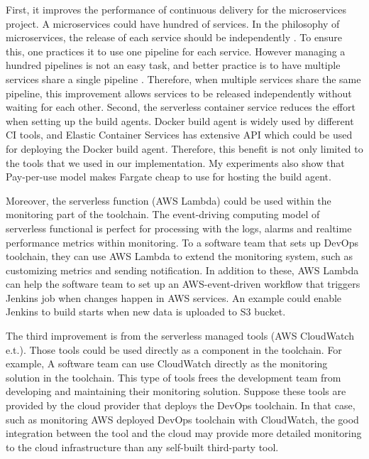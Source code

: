 First, it improves the performance of continuous delivery for the microservices project. A microservices could have hundred of services. In the philosophy of microservices, the release of each service should be independently \cite{dehghani2018break}. To ensure this, one practices it to use one pipeline for each service. However managing a hundred pipelines is not an easy task, and better practice is to have multiple services share a single pipeline \cite{HowtoSca9:online}. Therefore, when multiple services share the same pipeline, this improvement allows services to be released independently without waiting for each other.
Second, the serverless container service reduces the effort when setting up the build agents. Docker build agent is widely used by different CI tools, and Elastic Container Services has extensive API which could be used for deploying the Docker build agent. Therefore, this benefit is not only limited to the tools that we used in our implementation. My experiments also show that Pay-per-use model makes Fargate cheap to use for hosting the build agent.
\par
Moreover, the serverless function (AWS Lambda) could be used within the monitoring part of the toolchain. The event-driving computing model of serverless functional is perfect for processing with the logs, alarms and realtime performance metrics within monitoring. To a software team that sets up DevOps toolchain, they can use AWS Lambda to extend the monitoring system, such as customizing metrics and sending notification. In addition to these, AWS Lambda can help the software team to set up an AWS-event-driven workflow that triggers Jenkins job when changes happen in AWS services. An example could enable Jenkins to build starts when new data is uploaded to S3 bucket.
\par
The third improvement is from the serverless managed tools (AWS CloudWatch e.t.). Those tools could be used directly as a component in the toolchain. For example, A software team can use CloudWatch directly as the monitoring solution in the toolchain. This type of tools frees the development team from developing and maintaining their monitoring solution. Suppose these tools are provided by the cloud provider that deploys the DevOps toolchain. In that case, such as monitoring AWS deployed DevOps toolchain with CloudWatch, the good integration between the tool and the cloud may provide more detailed monitoring to the cloud infrastructure than any self-built third-party tool.
\par
